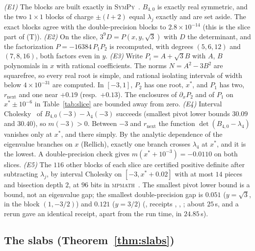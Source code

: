 \documentclass[11pt]{article}
\theoremstyle{definition}
\theoremstyle{remark}
\begin{document}
\emph{(E1)} The blocks are built exactly in \textsc{SymPy}~\cite{sympy2017}. $B_{4,0}$ is exactly real symmetric, and
the two $1\times1$ blocks of charge $\pm(l+2)$ equal $\lambda_j$ exactly and are set aside. The exact blocks agree with
the double-precision blocks to $2.8\times10^{-14}$ (this is the slice part of (T)).
\emph{(E2)} On the slice, $3^9D=P(x,y,\sqrt3)$ with $D$ the determinant, and the factorization $P=-16384\,P_1P_2$ is
recomputed, with degrees $(5,6,12)$ and $(7,8,16)$, both factors even in $y$.
\emph{(E3)} Write $P_i=A+\sqrt3B$ with $A$, $B$ polynomials in $x$ with rational coefficients. The norms $N=A^2-3B^2$ are
squarefree, so every real root is simple, and rational isolating intervals of width below $4\times10^{-31}$ are computed.
In $[-3,1]$, $P_2$ has one root, $x^*$, and $P_1$ has two, $r_{\mathrm{next}}$ and one near $+0.19$ (resp.\ $+0.13$). The
enclosures of $\partial_xP_2$ and of $P_1$ on $x^*\pm10^{-6}$ in Table~\ref{tab:slice} are bounded away from zero.
\emph{(E4)} Interval Cholesky~\cite{alefeldmayer1993} of $B_{4,0}(-3)-\lambda_4(-3)$ succeeds (smallest pivot lower
bounds $30.09$ and $30.40$), so $m(-3)>0$. Between $-3$ and $r_{\mathrm{next}}$ the function $\det(B_{4,0}-\lambda_4)$
vanishes only at $x^*$, and there simply. By the analytic dependence of the eigenvalue branches on $x$ (Rellich),
exactly one branch crosses $\lambda_4$ at $x^*$, and it is the lowest. A double-precision check gives
$m(x^*+10^{-3})=-0.0110$ on both slices.
\emph{(E5)} The $116$ other blocks of each slice are certified positive definite after subtracting $\lambda_j$, by
interval Cholesky on $[-3,x^*+0.02]$ with at most $14$ pieces and bisection depth $2$, at $96$ bits in
\textsc{mpmath}~\cite{mpmath}. The smallest pivot lower bound is a bound, not an eigenvalue gap; the smallest
double-precision gap is $0.051$ ($y=\sqrt3$, in the block $(1,-3/2)$) and $0.121$ ($y=3/2$)
(, receipts , ,
; about $25$\,s, and a rerun gave an identical receipt, apart from the run time, in
$24.85$\,s).

\subsection{The slabs (Theorem~\ref{thm:slabs})}\label{app:slabs}
\end{document}
